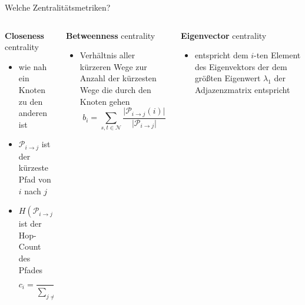 \documentclass[aspectratio=169,10pt]{beamer}
\begin{document}
\begin{frame}{Welche Zentralit\"atsmetriken?}
\begin{columns}
\begin{column}[t]{0.3\paperwidth}
\textbf{Closeness} centrality
    \begin{itemize}
    \item wie nah ein Knoten zu den anderen ist
    \item $\mathcal{P}_{i\rightarrow j}$ ist der k\"urzeste Pfad von $i$ nach $j$
    \item $H(\mathcal{P}_{i\rightarrow j})$ ist der Hop-Count des Pfades
    \[
    c_i = \frac{1}{\sum_{j\neq i}H(\mathcal{P}_{i\rightarrow j})}
    \]
    \end{itemize}
\end{column}

\begin{column}[t]{0.3\paperwidth}
\textbf{Betweenness} centrality
    \begin{itemize}
    \item Verh\"altnis aller k\"urzeren Wege zur Anzahl der k\"urzesten Wege die durch den Knoten gehen
    \[
    b_i = \sum_{s,t\in\mathcal{N}}\frac{\lvert\mathcal{P}_{i\rightarrow j}(i)\rvert}{\lvert\mathcal{P}_{i\rightarrow j}\rvert} 
    \]
    \end{itemize}
\end{column}

\begin{column}[t]{0.3\paperwidth}
\textbf{Eigenvector} centrality
    \begin{itemize}
    \item entspricht dem $i$-ten Element des Eigenvektors der dem gr\"o\ss ten Eigenwert $\lambda_1$ der Adjazenzmatrix entspricht
    \end{itemize}
\end{column}
\end{columns}
\end{frame}
\end{document}
